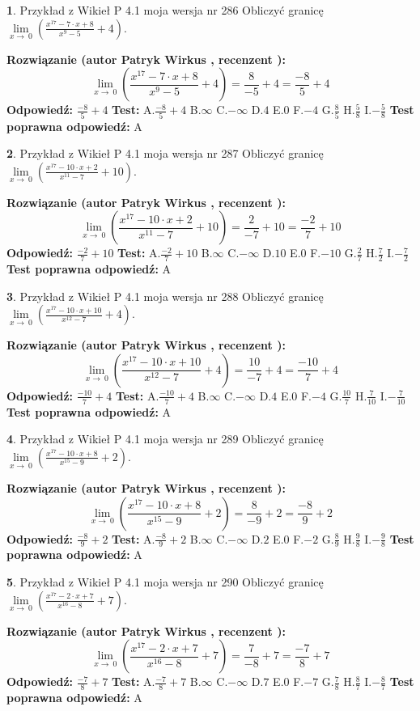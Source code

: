 \documentclass[12pt, a4paper]{article}
\theoremstyle{definition} %
\newtheorem{zad}{}
\newcommand{\zadStart}[1]{\begin{zad}#1\newline}
\newcommand{\zadStop}{\end{zad}}
\newcommand{\rozwStart}[2]{\noindent \textbf{Rozwiązanie (autor #1 , recenzent #2): }\newline}
\newcommand{\rozwStop}{\newline}
\newcommand{\odpStart}{\noindent \textbf{Odpowiedź:}\newline}
\newcommand{\odpStop}{\newline}
\newcommand{\testStart}{\noindent \textbf{Test:}\newline}
\newcommand{\testStop}{\newline}
\newcommand{\kluczStart}{\noindent \textbf{Test poprawna odpowiedź:}\newline}
\newcommand{\kluczStop}{\newline}
\begin{document}
\zadStart{Przykład z Wikieł P 4.1 moja wersja nr 286}
Obliczyć granicę $\lim\limits_{x\to\ 0}(\frac{x^{17}-7 \cdot x +8}{x^{9}-5}+4)$.
\zadStop
\rozwStart{Patryk Wirkus}{}
$$\lim\limits_{x\to\ 0}(\frac{x^{17}-7 \cdot x +8}{x^{9}-5}+4)=\frac{8}{-5}+4=\frac{-8}{5}+4$$
\rozwStop
\odpStart
$\frac{-8}{5}+4$
\odpStop
\testStart
A.$\frac{-8}{5}+4$
B.$\infty$
C.$-\infty$
D.$4$
E.$0$
F.$-4$
G.$\frac{8}{5}$
H.$\frac{5}{8}$
I.$-\frac{5}{8}$
\testStop
\kluczStart
A
\kluczStop



\zadStart{Przykład z Wikieł P 4.1 moja wersja nr 287}
Obliczyć granicę $\lim\limits_{x\to\ 0}(\frac{x^{17}-10 \cdot x +2}{x^{11}-7}+10)$.
\zadStop
\rozwStart{Patryk Wirkus}{}
$$\lim\limits_{x\to\ 0}(\frac{x^{17}-10 \cdot x +2}{x^{11}-7}+10)=\frac{2}{-7}+10=\frac{-2}{7}+10$$
\rozwStop
\odpStart
$\frac{-2}{7}+10$
\odpStop
\testStart
A.$\frac{-2}{7}+10$
B.$\infty$
C.$-\infty$
D.$10$
E.$0$
F.$-10$
G.$\frac{2}{7}$
H.$\frac{7}{2}$
I.$-\frac{7}{2}$
\testStop
\kluczStart
A
\kluczStop



\zadStart{Przykład z Wikieł P 4.1 moja wersja nr 288}
Obliczyć granicę $\lim\limits_{x\to\ 0}(\frac{x^{17}-10 \cdot x +10}{x^{12}-7}+4)$.
\zadStop
\rozwStart{Patryk Wirkus}{}
$$\lim\limits_{x\to\ 0}(\frac{x^{17}-10 \cdot x +10}{x^{12}-7}+4)=\frac{10}{-7}+4=\frac{-10}{7}+4$$
\rozwStop
\odpStart
$\frac{-10}{7}+4$
\odpStop
\testStart
A.$\frac{-10}{7}+4$
B.$\infty$
C.$-\infty$
D.$4$
E.$0$
F.$-4$
G.$\frac{10}{7}$
H.$\frac{7}{10}$
I.$-\frac{7}{10}$
\testStop
\kluczStart
A
\kluczStop



\zadStart{Przykład z Wikieł P 4.1 moja wersja nr 289}
Obliczyć granicę $\lim\limits_{x\to\ 0}(\frac{x^{17}-10 \cdot x +8}{x^{15}-9}+2)$.
\zadStop
\rozwStart{Patryk Wirkus}{}
$$\lim\limits_{x\to\ 0}(\frac{x^{17}-10 \cdot x +8}{x^{15}-9}+2)=\frac{8}{-9}+2=\frac{-8}{9}+2$$
\rozwStop
\odpStart
$\frac{-8}{9}+2$
\odpStop
\testStart
A.$\frac{-8}{9}+2$
B.$\infty$
C.$-\infty$
D.$2$
E.$0$
F.$-2$
G.$\frac{8}{9}$
H.$\frac{9}{8}$
I.$-\frac{9}{8}$
\testStop
\kluczStart
A
\kluczStop



\zadStart{Przykład z Wikieł P 4.1 moja wersja nr 290}
Obliczyć granicę $\lim\limits_{x\to\ 0}(\frac{x^{17}-2 \cdot x +7}{x^{16}-8}+7)$.
\zadStop
\rozwStart{Patryk Wirkus}{}
$$\lim\limits_{x\to\ 0}(\frac{x^{17}-2 \cdot x +7}{x^{16}-8}+7)=\frac{7}{-8}+7=\frac{-7}{8}+7$$
\rozwStop
\odpStart
$\frac{-7}{8}+7$
\odpStop
\testStart
A.$\frac{-7}{8}+7$
B.$\infty$
C.$-\infty$
D.$7$
E.$0$
F.$-7$
G.$\frac{7}{8}$
H.$\frac{8}{7}$
I.$-\frac{8}{7}$
\testStop
\kluczStart
A
\kluczStop
\end{document}
